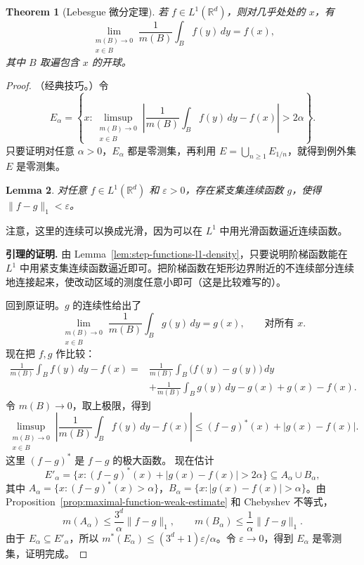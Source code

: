 \documentclass[12pt,letterpaper,twoside,openright]{ctexbook}
\theoremstyle{bluehead}
\newtheorem{theorem}{Theorem}
\newtheorem{lemma}[theorem]{Lemma}
\theoremstyle{olivehead}
\theoremstyle{orangehead}
\theoremstyle{redremark}
\begin{document}
\begin{theorem}[Lebesgue 微分定理]\label{thm:lebesgue-differentiation}
若 $f\in L^1(\mathbb R^d)$，则对几乎处处的 $x$，有
\[
\lim_{\substack{m(B)\to0\\x\in B}}\frac{1}{m(B)}\int_B f(y)\,dy=f(x),
\]
其中 $B$ 取遍包含 $x$ 的开球。
\end{theorem}
\begin{proof}
（经典技巧。）令
\[
E_\alpha=\left\{x:\limsup_{\substack{m(B)\to0\\x\in B}}
\left|\frac1{m(B)}\int_B f(y)\,dy-f(x)\right|>2\alpha\right\}.
\]
只要证明对任意 $\alpha>0$，$E_\alpha$ 都是零测集，再利用 $E=\bigcup_{n\geq1}E_{1/n}$，就得到例外集 $E$ 是零测集。

\begin{lemma}\label{lem:continuous-compact-support-l1-approx}
对任意 $f\in L^1(\mathbb R^d)$ 和 $\varepsilon>0$，存在紧支集连续函数 $g$，使得 $\|f-g\|_1<\varepsilon$。
\end{lemma}

注意，这里的连续可以换成光滑，因为可以在 $L^1$ 中用光滑函数逼近连续函数。

\textbf{引理的证明.} 由 Lemma~\ref{lem:step-functions-l1-density}，只要说明阶梯函数能在 $L^1$ 中用紧支集连续函数逼近即可。把阶梯函数在矩形边界附近的不连续部分连续地连接起来，使改动区域的测度任意小即可（这是比较难写的）。

回到原证明。$g$ 的连续性给出了
\[
\lim_{\substack{m(B)\to0\\x\in B}}\frac1{m(B)}\int_B g(y)\,dy=g(x),\qquad\text{对所有 }x.
\]
现在把 $f,g$ 作比较：
\[
\begin{aligned}
\frac1{m(B)}\int_B f(y)\,dy-f(x)
={}&\frac1{m(B)}\int_B\bigl(f(y)-g(y)\bigr)\,dy\\
&+\frac1{m(B)}\int_Bg(y)\,dy-g(x)+g(x)-f(x).
\end{aligned}
\]
令 $m(B)\to0$，取上极限，得到
\[
\limsup_{\substack{m(B)\to0\\x\in B}}
\left|\frac1{m(B)}\int_B f(y)\,dy-f(x)\right|
\leq(f-g)^*(x)+|g(x)-f(x)|.
\]
这里 $(f-g)^*$ 是 $f-g$ 的极大函数。
现在估计
\[
E'_\alpha=\{x:(f-g)^*(x)+|g(x)-f(x)|>2\alpha\}
\subseteq A_\alpha\cup B_\alpha,
\]
其中 $A_\alpha=\{x:(f-g)^*(x)>\alpha\}$，$B_\alpha=\{x:|g(x)-f(x)|>\alpha\}$。由 Proposition~\ref{prop:maximal-function-weak-estimate} 和 Chebyshev 不等式，
\[
m(A_\alpha)\leq\frac{3^d}{\alpha}\|f-g\|_1,
\qquad m(B_\alpha)\leq\frac1\alpha\|f-g\|_1.
\]
由于 $E_\alpha\subseteq E'_\alpha$，所以 $m^*(E_\alpha)\leq(3^d+1)\varepsilon/\alpha$。令 $\varepsilon\to0$，得到 $E_\alpha$ 是零测集，证明完成。
\end{proof}
\end{document}
